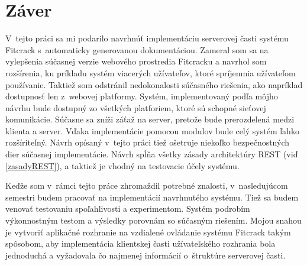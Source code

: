 \documentclass[slovak]{fitthesis}
\begin{document}
\chapter{Záver}\label{zaver}
V~tejto práci sa mi podarilo navrhnúť implementáciu serverovej časti systému Fitcrack s~automaticky generovanou dokumentáciou. Zameral som sa na vylepšenia súčasnej verzie webového prostredia Fitcracku a navrhol som rozšírenia, ku príkladu systém viacerých užívateľov, ktoré spríjemnia užívateľom používanie. Taktiež som odstránil nedokonalosti súčasného riešenia, ako napríklad dostupnosť len z~webovej platformy. Systém, implementovaný podľa môjho návrhu bude dostupný zo všetkých platforiem, ktoré sú schopné sieťovej komunikácie. Súčasne sa zníži záťaž na server, pretože bude prerozdelená medzi klienta a server. Vďaka implementácie pomocou modulov bude celý systém ľahko rozšíriteľný. Návrh opísaný v~tejto práci tiež ošetruje niekoľko bezpečnostných dier súčasnej implementácie. Návrh spĺňa všetky zásady architektúry REST (viď \ref{zasadyREST}), a taktiež je vhodný na testovacie účely systému.

Keďže som v~rámci tejto práce zhromaždil potrebné znalosti, v~nasledujúcom semestri budem pracovať na implementácií navrhnutého systému. Tiež sa budem venovať testovaniu spoľahlivosti a experimentom. Systém podrobím výkonnostným testom a výsledky porovnám so súčasným riešením. 
Mojou snahou je vytvoriť aplikačné rozhranie na vzdialené ovládanie systému Fitcrack takým spôsobom, aby implementácia klientskej časti užívateľského rozhrania bola jednoduchá a vyžadovala čo najmenej informácií o~štruktúre serverovej časti. 






\ifslovak
  \makeatletter
  \def\@openbib@code{\addcontentsline{toc}{chapter}{Literatúra}}
  \makeatother
  
\else
  \ifczech
    \makeatletter
    \def\@openbib@code{\addcontentsline{toc}{chapter}{Literatura}}
    \makeatother
    
  \else 
    \makeatletter
    \def\@openbib@code{\addcontentsline{toc}{chapter}{Bibliography}}
    \makeatother
    
  \fi
\fi
  \begin{flushleft}
  
  \end{flushleft}

  \iftwoside
    \cleardoublepage
  \fi
\end{document}
